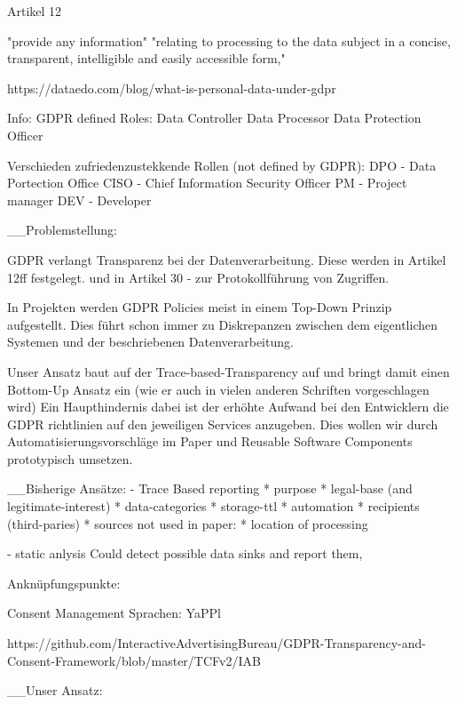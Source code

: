 Artikel 12 

"provide any information" "relating to processing to the data subject in a concise, transparent, intelligible and easily accessible form," 


https://dataedo.com/blog/what-is-personal-data-under-gdpr


Info: 
GDPR defined Roles: 
Data Controller
Data Processor 
Data Protection Officer 


Verschieden zufriedenzustekkende Rollen (not defined by GDPR): \cite{Spoto2018StaticCompliance}
DPO - Data Portection Office
CISO - Chief  Information  Security  Officer
PM - Project manager
DEV - Developer



__Problemstellung: 

GDPR verlangt Transparenz bei der Datenverarbeitung. 
Diese werden in Artikel 12ff festgelegt. 
und in Artikel 30 - zur Protokollführung von Zugriffen. 

In Projekten werden GDPR Policies meist in einem Top-Down Prinzip aufgestellt. 
Dies führt schon immer zu Diskrepanzen zwischen dem eigentlichen Systemen und der beschriebenen Datenverarbeitung.


Unser Ansatz baut auf der Trace-based-Transparency auf und bringt damit einen Bottom-Up Ansatz ein (wie er auch in vielen anderen Schriften vorgeschlagen wird) \cite{DelacroixBottom-upGovernance}
Ein Haupthindernis dabei ist der erhöhte Aufwand bei den Entwicklern die GDPR richtlinien auf den jeweiligen Services anzugeben. 
Dies wollen wir durch Automatisierungsvorschläge im Paper und Reusable Software Components prototypisch umsetzen. 



__Bisherige Ansätze: 
- Trace Based \cite{ErnstTransparencyComputing} 
reporting 
 * purpose
 * legal-base (and legitimate-interest)
 * data-categories
 * storage-ttl
 * automation
 * recipients (third-paries)
 * sources
 not used in paper:
 * location of processing


- static anlysis \cite{Spoto2018StaticCompliance}
Could detect possible data sinks and report them, 

Anknüpfungspunkte: 

Consent Management Sprachen: 
YaPPl 

https://github.com/InteractiveAdvertisingBureau/GDPR-Transparency-and-Consent-Framework/blob/master/TCFv2/IAB%


__Unser Ansatz: 

